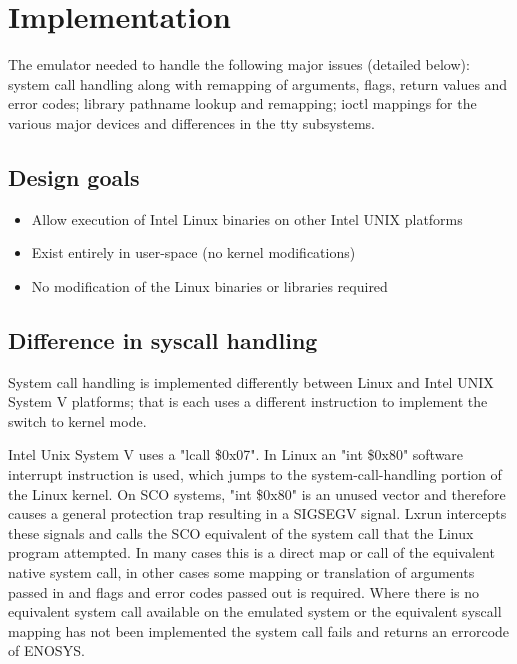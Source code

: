 \documentclass[letterpaper]{article}
\begin{document}
\section{Implementation}

The emulator needed to handle the following major issues (detailed below):
system call handling along with remapping of arguments, flags, return values
and error codes; library pathname lookup and remapping; ioctl mappings for
the various major devices and differences in the tty subsystems.




\subsection{Design goals}

\begin{itemize}
\item Allow execution of Intel Linux binaries on other Intel UNIX platforms
\item Exist entirely in user-space (no kernel modifications)
\item No modification of the Linux binaries or libraries required
\end{itemize}



\subsection{Difference in syscall handling}

System call handling is implemented differently between Linux and Intel
UNIX System V platforms; that is each uses a different instruction
to implement the switch to kernel mode.

Intel Unix System V uses a "lcall \$0x07".  In Linux an "int \$0x80" software
interrupt instruction is used, which jumps to the  system-call-handling 
portion of the Linux kernel. On SCO systems, "int \$0x80" is an unused vector 
and therefore causes a general protection trap resulting in a SIGSEGV
signal. Lxrun intercepts these signals and calls the SCO equivalent of
the system call that the Linux program attempted. In many cases this is
a direct map or call of the equivalent native system call, in other cases
some mapping or translation of arguments passed in and flags and error codes
passed out is required. Where there is no equivalent system call available
on the emulated system or the equivalent syscall mapping has not been
implemented the system call fails and returns an errorcode of ENOSYS.
\end{document}
